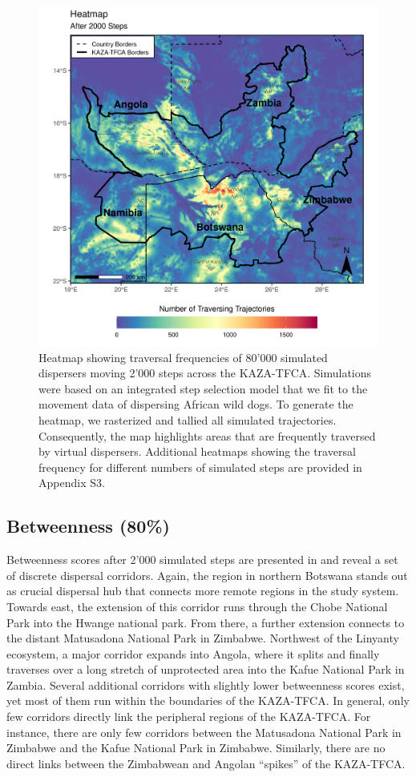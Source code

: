 \documentclass[abstract=on,10pt,a4paper,bibliography=totocnumbered]{article}
\begin{document}
\begin{figure}
  \includegraphics[width=\textwidth]{99_Heatmap.png}
  \caption{Heatmap showing traversal frequencies of 80'000 simulated dispersers
  moving 2'000 steps across the KAZA-TFCA. Simulations were based on an
  integrated step selection model that we fit to the movement data of dispersing
  African wild dogs. To generate the heatmap, we rasterized and tallied all
  simulated trajectories. Consequently, the map highlights areas that are
  frequently traversed by virtual dispersers. Additional heatmaps showing the
  traversal frequency for different numbers of simulated steps are provided in
  Appendix S3.}
  \label{Heatmap}
\end{figure}

\subsection{Betweenness (80\%)}
Betweenness scores after 2'000 simulated steps are presented in
 and reveal a set of discrete dispersal corridors. Again, the
region in northern Botswana stands out as crucial dispersal hub that connects
more remote regions in the study system. Towards east, the extension of this
corridor runs through the Chobe National Park into the Hwange national park.
From there, a further extension connects to the distant Matusadona National Park
in Zimbabwe. Northwest of the Linyanty ecosystem, a major corridor expands into
Angola, where it splits and finally traverses over a long stretch of unprotected
area into the Kafue National Park in Zambia. Several additional corridors with
slightly lower betweenness scores exist, yet most of them run within the
boundaries of the KAZA-TFCA. In general, only few corridors directly link the
peripheral regions of the KAZA-TFCA. For instance, there are only few corridors
between the Matusadona National Park in Zimbabwe and the Kafue National Park in
Zimbabwe. Similarly, there are no direct links between the Zimbabwean and
Angolan ``spikes'' of the KAZA-TFCA.
\end{document}
